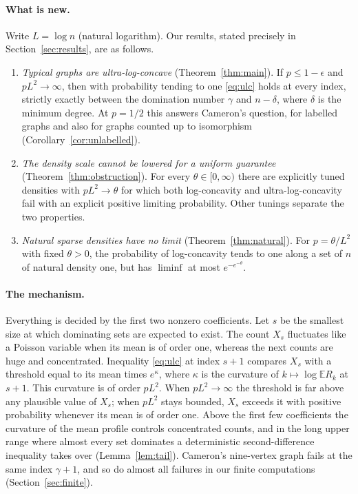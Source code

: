 \documentclass[11pt]{article}
\theoremstyle{remark}
\newcommand{\E}{\mathbb E}
\begin{document}
\paragraph{What is new.} Write $L=\log n$ (natural logarithm). Our results, stated precisely in Section~\ref{sec:results}, are as follows.
\begin{enumerate}[label=(\roman*)]
\item \emph{Typical graphs are ultra-log-concave} (Theorem~\ref{thm:main}). If $p\le 1-\epsilon$ and $pL^2\to\infty$, then with probability tending to one \eqref{eq:ulc} holds at every index, strictly exactly between the domination number $\gamma$ and $n-\delta$, where $\delta$ is the minimum degree. At $p=1/2$ this answers Cameron's question, for labelled graphs and also for graphs counted up to isomorphism (Corollary~\ref{cor:unlabelled}).
\item \emph{The density scale cannot be lowered for a uniform guarantee} (Theorem~\ref{thm:obstruction}). For every $\theta\in[0,\infty)$ there are explicitly tuned densities with $pL^2\to\theta$ for which both log-concavity and ultra-log-concavity fail with an explicit positive limiting probability. Other tunings separate the two properties.
\item \emph{Natural sparse densities have no limit} (Theorem~\ref{thm:natural}). For $p=\theta/L^2$ with fixed $\theta>0$, the probability of log-concavity tends to one along a set of $n$ of natural density one, but has $\liminf$ at most $e^{-e^{-\theta}}$.
\end{enumerate}

\paragraph{The mechanism.} Everything is decided by the first two nonzero coefficients. Let $s$ be the smallest size at which dominating sets are expected to exist. The count $X_s$ fluctuates like a Poisson variable when its mean is of order one, whereas the next counts are huge and concentrated. Inequality \eqref{eq:ulc} at index $s+1$ compares $X_s$ with a threshold equal to its mean times $e^{\kappa}$, where $\kappa$ is the curvature of $k\mapsto\log\E R_k$ at $s+1$. This curvature is of order $pL^2$. When $pL^2\to\infty$ the threshold is far above any plausible value of $X_s$; when $pL^2$ stays bounded, $X_s$ exceeds it with positive probability whenever its mean is of order one. Above the first few coefficients the curvature of the mean profile controls concentrated counts, and in the long upper range where almost every set dominates a deterministic second-difference inequality takes over (Lemma~\ref{lem:tail}). Cameron's nine-vertex graph fails at the same index $\gamma+1$, and so do almost all failures in our finite computations (Section~\ref{sec:finite}).
\end{document}
